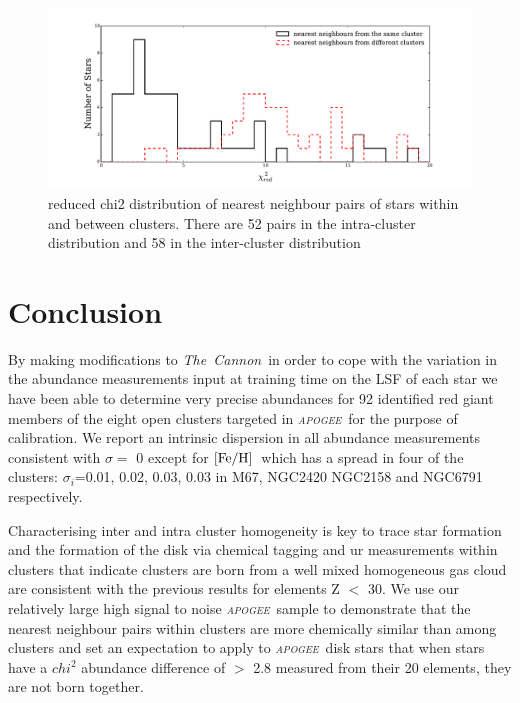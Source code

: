 \documentclass[14pt, preprint2]{aastex6}
\newcommand{\project}[1]{\textsl{#1}}
\newcommand{\tc}{\project{The~Cannon}}
\newcommand{\apogee}{\project{\textsc{apogee}}}
\newcommand{\feh}{\mbox{$\rm [Fe/H]$}}
\begin{document}
\begin{figure}[h!]
\includegraphics[scale=0.5]{chi2red.pdf} 
  \caption{reduced chi2 distribution of nearest neighbour pairs of stars within and between clusters. There are 52 pairs in the intra-cluster distribution and 58 in the inter-cluster distribution}
\label{fig:chi2}
\end{figure}





\section{Conclusion}


By making modifications to \tc\ in order to cope with the variation in the abundance measurements input at training time on the LSF of each star we have been able to determine very precise abundances for 92 identified red giant members of the eight open clusters targeted in \apogee\ for the purpose of calibration. We report an intrinsic dispersion in all abundance measurements consistent with $\sigma=$ 0 except for \feh\ which has a spread in four of the clusters: $\sigma_i$=0.01, 0.02,  0.03, 0.03 in M67, NGC2420 NGC2158 and NGC6791 respectively. 

Characterising inter and intra cluster homogeneity is key to trace star formation and the formation of the disk via chemical tagging and ur measurements within clusters that indicate clusters are born from a well mixed homogeneous gas cloud are consistent with the previous results for elements Z $<$ 30. We use our relatively large high signal to noise \apogee\ sample to demonstrate that the nearest neighbour pairs within clusters are more chemically similar than among clusters and set an expectation to apply to \apogee\ disk stars that when stars have a $chi^2$ abundance difference of $>$ 2.8 measured from their 20 elements, they are not born together. 
\end{document}
